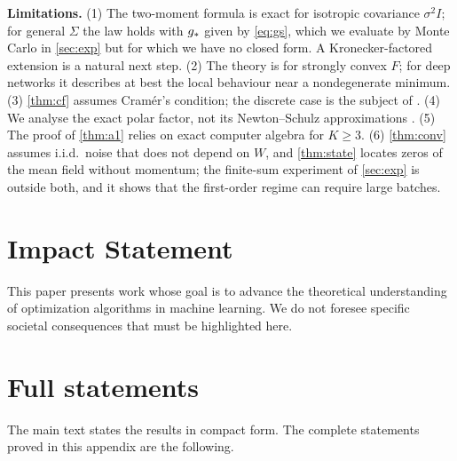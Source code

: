 \documentclass{article}
\theoremstyle{plain}
\theoremstyle{definition}
\theoremstyle{remark}
\begin{document}
\textbf{Limitations.} (1) The two-moment formula is exact for isotropic covariance $\sigma^2I$; for general $\Sigma$
the law holds with $g_\ast$ given by \eqref{eq:gs}, which we evaluate by Monte Carlo in \cref{sec:exp} but for which we
have no closed form. A Kronecker-factored extension is a natural next step. (2) The theory is for strongly convex
$F$; for deep networks it describes at best the local behaviour near a nondegenerate minimum. (3) \cref{thm:cf} assumes
Cram\'er's condition; the discrete case is the subject of \citet{companionII}. (4) We analyse the exact polar factor,
not its Newton--Schulz approximations \citep{do2026muon,shulgin2026quadratic}. (5) The proof of \cref{thm:a1} relies on exact
computer algebra for $K\ge3$. (6) \cref{thm:conv} assumes i.i.d.\ noise that does not depend on $W$, and
\cref{thm:state} locates zeros of the mean field without momentum; the finite-sum experiment of \cref{sec:exp} is
outside both, and it shows that the first-order regime can require large batches.

\section*{Impact Statement}
This paper presents work whose goal is to advance the theoretical understanding of optimization algorithms in machine
learning. We do not foresee specific societal consequences that must be highlighted here.




\newpage
\appendix
\onecolumn

\section{Full statements}\label{app:full}
The main text states the results in compact form. The complete statements proved in this appendix are the following.
\end{document}
